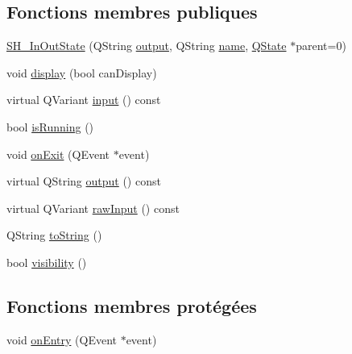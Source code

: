 \subsection*{Fonctions membres publiques}
\begin{DoxyCompactItemize}
\item 
\hyperlink{classSH__InOutState_a5fa88487103a8e197a8453c991bb056b}{S\-H\-\_\-\-In\-Out\-State} (Q\-String \hyperlink{classSH__InOutState_a17ed7eaf5e3ed5af80a4f9fe65d5bfd9}{output}, Q\-String \hyperlink{classSH__NamedObject_a9f686c6f2a5bcc08ad03d0cee0151f0f}{name}, \hyperlink{classQState}{Q\-State} $\ast$parent=0)
\item 
void \hyperlink{classSH__InOutState_a616f88b20478b81b2927a9ddc2b4f521}{display} (bool can\-Display)
\item 
virtual Q\-Variant \hyperlink{classSH__InOutState_a8e1b78069343122df7713624a1a5a100}{input} () const 
\item 
bool \hyperlink{classSH__GenericState_a5f731810dad0cacd28828ccbf1539e4e}{is\-Running} ()
\item 
void \hyperlink{classSH__InOutState_afc0433d63375063a43e39adca641e330}{on\-Exit} (Q\-Event $\ast$event)
\item 
virtual Q\-String \hyperlink{classSH__InOutState_a17ed7eaf5e3ed5af80a4f9fe65d5bfd9}{output} () const 
\item 
virtual Q\-Variant \hyperlink{classSH__InOutState_a4c674a54f41d2e6ef951b22393dcd89f}{raw\-Input} () const 
\item 
Q\-String \hyperlink{classSH__GenericState_a7779babbb40f3f8faa71112204d9804f}{to\-String} ()
\item 
bool \hyperlink{classSH__InOutState_a3a18752c4122c26a2ebf38310c9c1b75}{visibility} ()
\end{DoxyCompactItemize}
\subsection*{Fonctions membres protégées}
\begin{DoxyCompactItemize}
\item 
void \hyperlink{classSH__GenericState_a68c67ef95738e01cd34cd5926f4932fb}{on\-Entry} (Q\-Event $\ast$event)
\end{DoxyCompactItemize}
